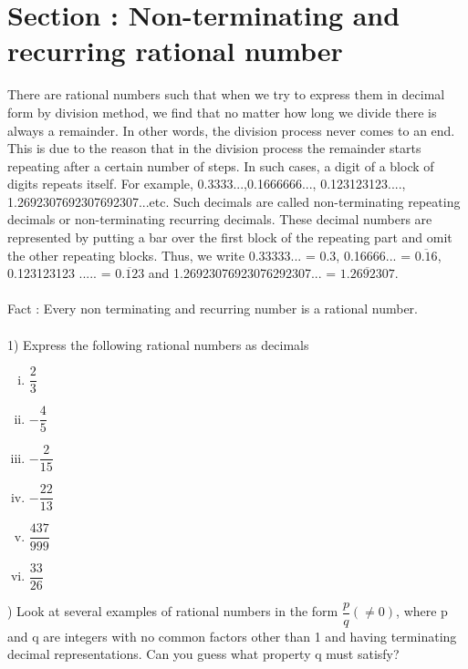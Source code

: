 \documentclass[a4paper,10pt]{article}
\begin{document}
\section{Section : Non-terminating and recurring rational number}
There are rational numbers such that when we try to express them in
decimal form by
division method, we find that no matter how long we divide there is
always a remainder. In
other words, the division process never comes to an end. This is due to
the reason that in the
division process the remainder starts repeating after a certain number
of steps. In such cases,
a digit of a block of digits repeats itself. For example,
0.3333...,0.1666666...,
0.123123123...., 1.2692307692307692307...etc. Such decimals are called
non-terminating
repeating decimals or non-terminating recurring decimals. These decimal
numbers are
represented by putting a bar over the first block of the repeating part
and omit the other
repeating blocks. Thus, we write 0.33333... = 0.3, 0.16666... =
$\overline{0.16}$, 0.123123123 ..... = $\overline{0.123}$ and
1.26923076923076292307... = $\overline{1.2692307}$.\\\\
Fact : Every non terminating and recurring number is a rational
number.\\\\
1) Express the following rational numbers as decimals
\begin{multicols}{5}
\begin{enumerate}[(i)]
 \item $\dfrac{2}{3}$
 \item $-\dfrac{4}{5}$
 \item $-\dfrac{2}{15}$
 \item $-\dfrac{22}{13}$
 \item $\dfrac{437}{999}$
 \item $\dfrac{33}{26}$
\end{enumerate}
\end{multicols}
) Look at several examples of rational numbers in the form
$\dfrac{p}{q} (\neq 0)$, where p and q are integers with no common
factors other than 1 and having terminating decimal representations. Can
you guess what property q must satisfy?
\end{document}
